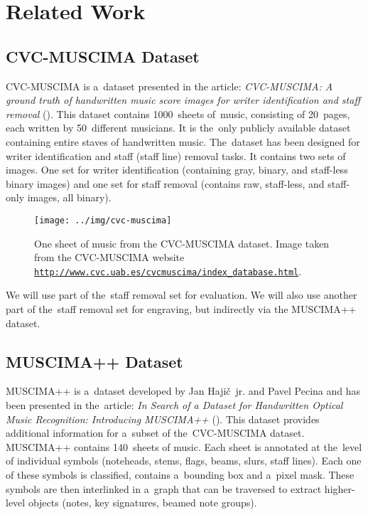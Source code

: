 \chapter{Related Work}
\label{chap:RelatedWork}


\section{CVC-MUSCIMA Dataset}
\label{sec:CvcMuscima}

CVC-MUSCIMA is a~dataset presented in the article: \emph{CVC-MUSCIMA: A ground truth of handwritten music score images for writer identification and staff removal} (\cite{CvcMuscima}). This dataset contains 1000~sheets of~music, consisting of 20~pages, each written by 50~different musicians. It is the~only publicly available dataset containing entire staves of handwritten music. The~dataset has been designed for writer identification and staff (staff line) removal tasks. It contains two sets of images. One set for writer identification (containing gray, binary, and staff-less binary images) and one set for staff removal (contains raw, staff-less, and staff-only images, all binary).

\begin{figure}[h]
    \centering
    \texttt{[image: ../img/cvc-muscima]}
    \caption{One sheet of music from the CVC-MUSCIMA dataset. Image taken from the CVC-MUSCIMA website \href{http://www.cvc.uab.es/cvcmuscima/index_database.html}{\texttt{http://www.cvc.uab.es/{\allowbreak}cvc{\allowbreak}muscima/{\allowbreak}index\_database.html}}.}
    \label{fig2:CvcMuscima}
\end{figure}

We will use part of the~staff removal set for evaluation. We will also use another part of the~staff removal set for engraving, but indirectly via the MUSCIMA++ dataset.


\section{MUSCIMA++ Dataset}

MUSCIMA++ is a~dataset developed by Jan Hajič~jr. and Pavel Pecina and has been presented in the~article: \emph{In Search of a Dataset for Handwritten Optical Music Recognition: Introducing MUSCIMA++} (\cite{MuscimaPP}). This dataset provides additional information for a~subset of the~CVC-MUSCIMA dataset. MUSCIMA++ contains 140~sheets of music. Each sheet is annotated at the~level of individual symbols (noteheads, stems, flags, beams, slurs, staff lines). Each one of these symbols is classified, contains a~bounding box and a~pixel mask. These symbols are then interlinked in a~graph that can be traversed to extract higher-level objects (notes, key signatures, beamed note groups).

